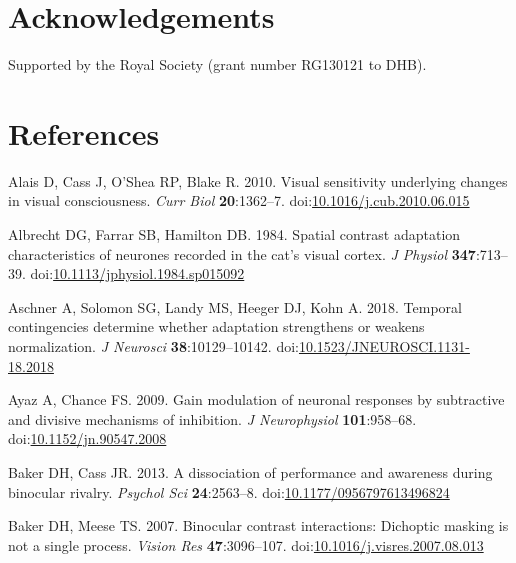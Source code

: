 \documentclass[]{article}
\begin{document}
\hypertarget{acknowledgements}{%
\section{Acknowledgements}\label{acknowledgements}}

Supported by the Royal Society (grant number RG130121 to DHB).

\hypertarget{references}{%
\section*{References}\label{references}}

\hypertarget{refs}{}
\leavevmode\hypertarget{ref-Alais2010}{}%
Alais D, Cass J, O'Shea RP, Blake R. 2010. Visual sensitivity underlying changes in visual consciousness. \emph{Curr Biol} \textbf{20}:1362--7. doi:\href{https://doi.org/10.1016/j.cub.2010.06.015}{10.1016/j.cub.2010.06.015}

\leavevmode\hypertarget{ref-Albrecht1984}{}%
Albrecht DG, Farrar SB, Hamilton DB. 1984. Spatial contrast adaptation characteristics of neurones recorded in the cat's visual cortex. \emph{J Physiol} \textbf{347}:713--39. doi:\href{https://doi.org/10.1113/jphysiol.1984.sp015092}{10.1113/jphysiol.1984.sp015092}

\leavevmode\hypertarget{ref-Aschner2018}{}%
Aschner A, Solomon SG, Landy MS, Heeger DJ, Kohn A. 2018. Temporal contingencies determine whether adaptation strengthens or weakens normalization. \emph{J Neurosci} \textbf{38}:10129--10142. doi:\href{https://doi.org/10.1523/JNEUROSCI.1131-18.2018}{10.1523/JNEUROSCI.1131-18.2018}

\leavevmode\hypertarget{ref-Ayaz2009}{}%
Ayaz A, Chance FS. 2009. Gain modulation of neuronal responses by subtractive and divisive mechanisms of inhibition. \emph{J Neurophysiol} \textbf{101}:958--68. doi:\href{https://doi.org/10.1152/jn.90547.2008}{10.1152/jn.90547.2008}

\leavevmode\hypertarget{ref-Baker2013}{}%
Baker DH, Cass JR. 2013. A dissociation of performance and awareness during binocular rivalry. \emph{Psychol Sci} \textbf{24}:2563--8. doi:\href{https://doi.org/10.1177/0956797613496824}{10.1177/0956797613496824}

\leavevmode\hypertarget{ref-Baker2007b}{}%
Baker DH, Meese TS. 2007. Binocular contrast interactions: Dichoptic masking is not a single process. \emph{Vision Res} \textbf{47}:3096--107. doi:\href{https://doi.org/10.1016/j.visres.2007.08.013}{10.1016/j.visres.2007.08.013}
\end{document}
